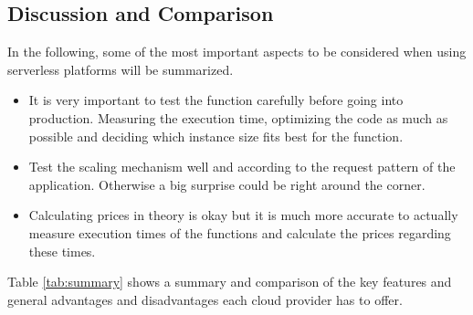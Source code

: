 \subsection*{Discussion and Comparison}
In the following, some of the most important aspects to be considered when using serverless platforms will be summarized.

\begin{itemize}
    \item It is very important to test the function carefully before going into production. Measuring the execution time, optimizing the code as much as possible and deciding which instance size fits best for the function.
    \item Test the scaling mechanism well and according to the request pattern of the application. Otherwise a big surprise could be right around the corner.
    \item Calculating prices in theory is okay but it is much more accurate to actually measure execution times of the functions and calculate the prices regarding these times.
\end{itemize}

Table \ref{tab:summary} shows a summary and comparison of the key features and general advantages and disadvantages each cloud provider has to offer.

